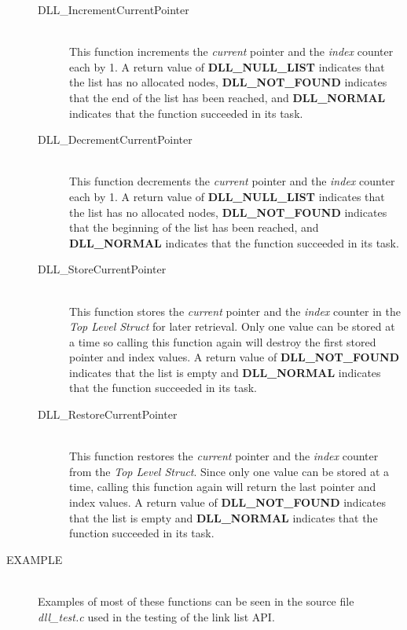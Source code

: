 \documentclass[10pt,letterpaper,titlepage]{article}
\begin{document}
\begin{description}
\begin{description}
 \item[DLL\_IncrementCurrentPointer]\quad\\
 This function increments the \emph{current} pointer and the \emph{index} counter each by 1.  A return value of \textbf{DLL\_NULL\_LIST} indicates that the list has no allocated nodes, \textbf{DLL\_NOT\_FOUND} indicates that the end of the list has been reached, and \textbf{DLL\_NORMAL} indicates that the function succeeded in its task.

 \item[DLL\_DecrementCurrentPointer]\quad\\
 This function decrements the \emph{current} pointer and the \emph{index} counter each by 1.  A return value of \textbf{DLL\_NULL\_LIST} indicates that the list has no allocated nodes, \textbf{DLL\_NOT\_FOUND} indicates that the beginning of the list has been reached, and \textbf{DLL\_NORMAL} indicates that the function succeeded in its task.

 \item[DLL\_StoreCurrentPointer]\quad\\
 This function stores the \emph{current} pointer and the \emph{index} counter in the \emph{Top Level Struct} for later retrieval.  Only one value can be stored at a time so calling this function again will destroy the first stored pointer and index values.  A return value of \textbf{DLL\_NOT\_FOUND} indicates that the list is empty and \textbf{DLL\_NORMAL} indicates that the function succeeded in its task.

 \item[DLL\_RestoreCurrentPointer]\quad\\
 This function restores the \emph{current} pointer and the \emph{index} counter from the \emph{Top Level Struct}.  Since only one value can be stored at a time, calling this function again will return the last pointer and index values.  A return value of \textbf{DLL\_NOT\_FOUND} indicates that the list is empty and \textbf{DLL\_NORMAL} indicates that the function succeeded in its task.
 \end{description}

\item[EXAMPLE]\quad\\
Examples of most of these functions can be seen in the source file \emph{dll\_test.c} used in the testing of the link list API.

\end{description}
\newpage
\end{document}
